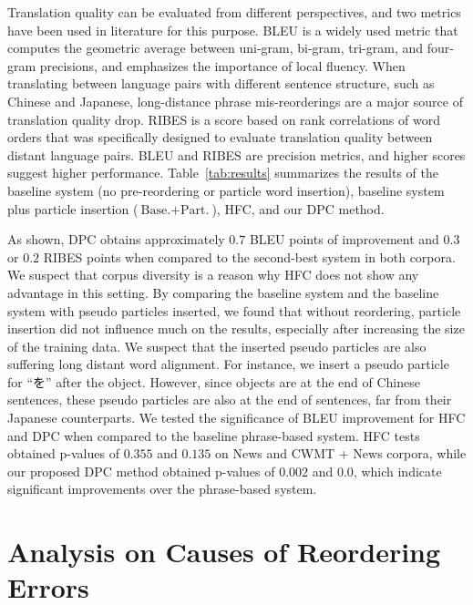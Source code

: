 \documentclass[english]{jnlp_1.4}
\begin{document}
Translation quality can be evaluated from different perspectives, and two metrics 
have been used in literature for this purpose. BLEU \cite{BLEU2002} is 
a widely used metric that computes the geometric average between uni-gram, bi-gram, 
tri-gram, and four-gram precisions, and emphasizes the importance of local fluency.
When translating between language pairs with different sentence structure, such 
as Chinese and Japanese, long-distance phrase mis-reorderings are a major source 
of translation quality drop. RIBES \cite{RIBES2010} is a score based on rank 
correlations of word orders that was specifically designed to evaluate translation 
quality between distant language pairs.
BLEU and RIBES are precision metrics, and higher scores suggest higher performance.
Table~\ref{tab:results} summarizes the results of the baseline system (no pre-reordering 
or particle word insertion), baseline system plus particle insertion ($\text{Base.} + \text{Part.}$), 
HFC, and our DPC method.

As shown, DPC obtains approximately $0.7$ BLEU points of improvement and $0.3$ 
or $0.2$ RIBES points when compared to the second-best system in both corpora.
We suspect that corpus diversity is a reason why HFC does not show any advantage in this setting. 
By comparing the baseline system and the baseline system with pseudo particles
inserted, we found that without reordering, particle insertion did not influence 
much on the results, especially after increasing the size of the training data. We suspect 
that the inserted pseudo particles are also suffering long distant word alignment. 
For instance, we insert a pseudo particle for ``を'' after the object. 
However, since objects are at the end of Chinese sentences, these pseudo particles
are also at the end of sentences, far from their Japanese counterparts.
We tested the significance of BLEU improvement for HFC and DPC when compared to 
the baseline phrase-based system. HFC tests obtained p-values of $0.355$ and $0.135$ 
on News and CWMT + News corpora, while our proposed DPC method obtained p-values of
$0.002$ and $0.0$, which indicate significant improvements over the phrase-based 
system.


\section{Analysis on Causes of Reordering Errors}
\label{sec:dis}
\end{document}
